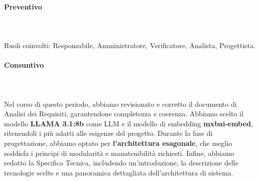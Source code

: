 \paragraph{Preventivo} \hspace{1cm} 
\\ \hspace{1cm} \\

Ruoli coinvolti: Responsabile, Amministratore, Verificatore, Analista, Progettista.
\begin{table}[H]
\centering
{}
\caption{Preventivo dell'impegno orario di ciascun membro durante il periodo VI}
\end{table}

\paragraph{Consuntivo} \hspace{1cm} 
\\ \hspace{1cm} \\
Nel corso di questo periodo, abbiamo revisionato e corretto il documento di Analisi dei Requisiti, garantendone completezza e coerenza. Abbiamo scelto il modello \textbf{LLAMA 3.1:8b} come LLM e il modello di embedding \textbf{mxbai-embed}, ritenendoli i più adatti alle esigenze del progetto. Durante la fase di progettazione, abbiamo optato per \textbf{l’architettura esagonale}, che meglio soddisfa i principi di modularità e manutenibilità richiesti. Infine, abbiamo redatto la Specifica Tecnica, includendo un’introduzione, la descrizione delle tecnologie scelte e una panoramica dettagliata dell’architettura di sistema.



